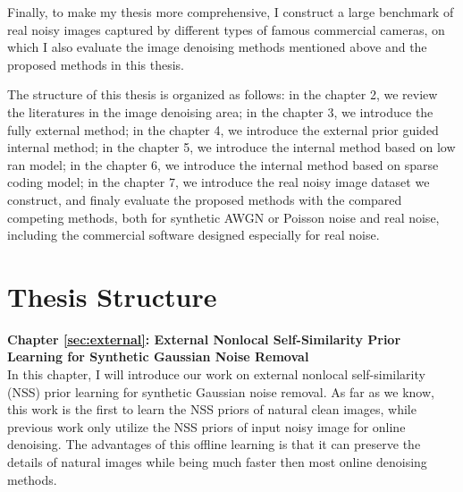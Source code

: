 Finally, to make my thesis more comprehensive, I construct a large benchmark of real noisy images captured by different types of famous commercial cameras, on which I also evaluate the image denoising methods mentioned above and the proposed methods in this thesis. 


The structure of this thesis is organized as follows: in the chapter 2, we review the literatures in the image denoising area; in the chapter 3, we introduce the fully external method; in the chapter 4, we introduce the external prior guided internal method; in the chapter 5, we introduce the internal method based on low ran model; in the chapter 6, we introduce the internal method based on sparse coding model; in the chapter 7, we introduce the real noisy image dataset we construct, and finaly evaluate the proposed methods with the compared competing methods, both for synthetic AWGN or Poisson noise and real noise, including the commercial software designed especially for real noise. 


\section{Thesis Structure}
\label{sec:intro:structure}






\textbf{Chapter \ref{sec:external}: External Nonlocal Self-Similarity Prior Learning for Synthetic Gaussian Noise Removal} \\[0.2em]

In this chapter, I will introduce our work on external nonlocal self-similarity (NSS) prior learning for synthetic Gaussian noise removal. As far as we know, this work is the first to learn the NSS priors of natural clean images, while previous work only utilize the NSS priors of input noisy image for online denoising. The advantages of this offline learning is that it can preserve the details of natural images while being much faster then most online denoising methods.


